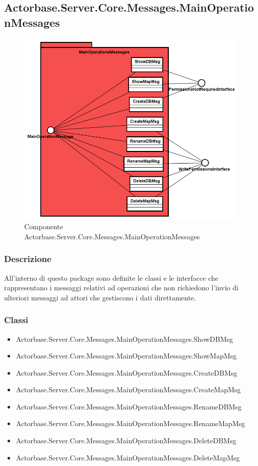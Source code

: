 \documentclass[a4paper]{article}
\begin{document}
			\subsection{Actorbase.Server.Core.Messages.MainOperationMessages}
			\begin{figure} [H]
			\centering
			\includegraphics[scale=0.55]{Server/Package/MainOperationsMessagesLevel.png}
			\caption{Componente Actorbase.Server.Core.Messages.MainOperationMessages}
			\end{figure}
			\subsubsection{Descrizione}
				All'interno di questo package sono definite le classi e le interfacce che rappresentano i messaggi relativi ad operazioni che non richiedono l'invio di ulteriori messaggi ad attori che gestiscono i dati direttamente.
			\subsubsection{Classi}
			\begin{itemize}
				\item Actorbase.Server.Core.Messages.MainOperationMessages.ShowDBMsg
				\item Actorbase.Server.Core.Messages.MainOperationMessages.ShowMapMsg
				\item Actorbase.Server.Core.Messages.MainOperationMessages.CreateDBMsg
				\item Actorbase.Server.Core.Messages.MainOperationMessages.CreateMapMsg
				\item Actorbase.Server.Core.Messages.MainOperationMessages.RenameDBMsg
				\item Actorbase.Server.Core.Messages.MainOperationMessages.RenameMapMsg
				\item Actorbase.Server.Core.Messages.MainOperationMessages.DeleteDBMsg
				\item Actorbase.Server.Core.Messages.MainOperationMessages.DeleteMapMsg
			\end{itemize}
\end{document}
